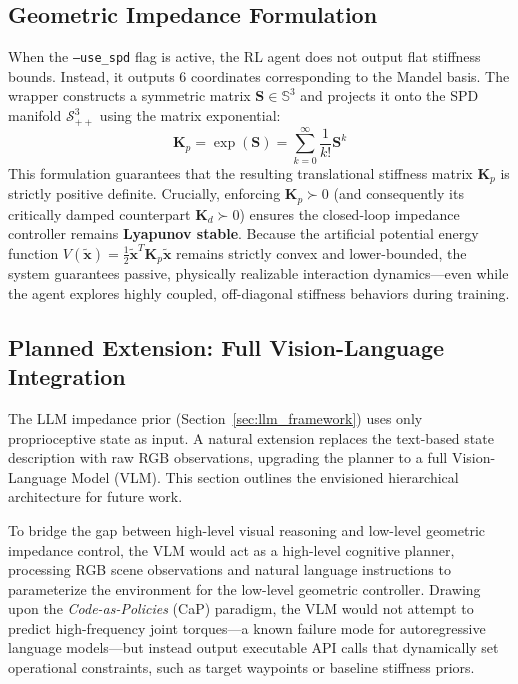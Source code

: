 \documentclass[letterpaper, 10 pt, conference]{IEEEtran}
\begin{document}
\subsection{Geometric Impedance Formulation}
When the \texttt{--use\_spd} flag is active, the RL agent does not output flat stiffness bounds. Instead, it outputs 6 coordinates corresponding to the Mandel basis. The wrapper constructs a symmetric matrix $\mathbf{S} \in \mathbb{S}^3$ and projects it onto the SPD manifold $\mathcal{S}_{++}^3$ using the matrix exponential:
\begin{equation}
    \mathbf{K}_p = \exp(\mathbf{S}) = \sum_{k=0}^{\infty} \frac{1}{k!} \mathbf{S}^k
\end{equation}
This formulation guarantees that the resulting translational stiffness matrix $\mathbf{K}_p$ is strictly positive definite. Crucially, enforcing $\mathbf{K}_p \succ 0$ (and consequently its critically damped counterpart $\mathbf{K}_d \succ 0$) ensures the closed-loop impedance controller remains \textbf{Lyapunov stable}. Because the artificial potential energy function $V(\tilde{\mathbf{x}}) = \frac{1}{2}\tilde{\mathbf{x}}^T \mathbf{K}_p \tilde{\mathbf{x}}$ remains strictly convex and lower-bounded, the system guarantees passive, physically realizable interaction dynamics—even while the agent explores highly coupled, off-diagonal stiffness behaviors during training.

\subsection{Planned Extension: Full Vision-Language Integration}
\label{sec:vlm_extension}
The LLM impedance prior (Section~\ref{sec:llm_framework}) uses only proprioceptive state as input.
A natural extension replaces the text-based state description with raw RGB observations, upgrading
the planner to a full Vision-Language Model (VLM). This section outlines the envisioned
hierarchical architecture for future work.

To bridge the gap between high-level visual reasoning and low-level geometric impedance control, the VLM would act as a high-level cognitive planner, processing RGB scene observations and natural language instructions to parameterize the environment for the low-level geometric controller.
Drawing upon the \textit{Code-as-Policies} (CaP) paradigm, the VLM would not attempt to predict high-frequency joint torques—a known failure mode for autoregressive language models—but instead output executable API calls that dynamically set operational constraints, such as target waypoints or baseline stiffness priors.
\end{document}
